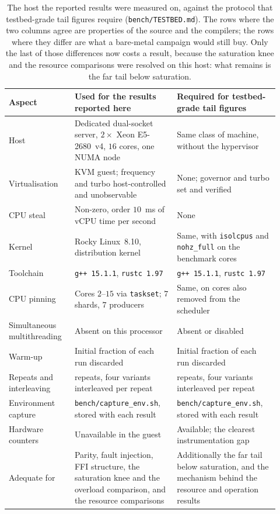 \documentclass[english,twoside,openright,a4paper,censored,csm,software-track-2020]{HYthesisML}
\begin{document}
\begin{table}
\centering
\small
\caption[The host used and the testbed protocol still to be executed]{The host the reported
results were measured on, against the protocol that testbed-grade tail figures require
(\texttt{bench/TESTBED.md}). The rows where the two columns agree are properties of the source and
the compilers; the rows where they differ are what a bare-metal campaign would still buy. Only the
last of those differences now costs a result, because the saturation knee and the resource
comparisons were resolved on this host: what remains is the far tail below
saturation.\label{tab:testbed}}
\renewcommand{\arraystretch}{1.2}
\begin{tabular}{@{}R{0.22\linewidth} R{0.35\linewidth} R{0.35\linewidth}@{}}
\hline\hline
Aspect & Used for the results reported here & Required for testbed-grade tail figures \\
\hline
Host & Dedicated dual-socket server, $2\times$ Xeon E5-2680~v4, $16$ cores, one NUMA node & Same class of machine, without the hypervisor \\
Virtualisation & KVM guest; frequency and turbo host-controlled and unobservable & None; governor and turbo set and verified \\
CPU steal & Non-zero, order $10$~ms of vCPU time per second & None \\
Kernel & Rocky Linux~8.10, distribution kernel & Same, with \texttt{isolcpus} and \texttt{nohz\_full} on the benchmark cores \\
Toolchain & \texttt{g++~15.1.1}, \texttt{rustc~1.97} & \texttt{g++~15.1.1}, \texttt{rustc~1.97} \\
CPU pinning & Cores $2$--$15$ via \texttt{taskset}; $7$ shards, $7$ producers & Same, on cores also removed from the scheduler \\
Simultaneous multithreading & Absent on this processor & Absent or disabled \\
Warm-up & Initial fraction of each run discarded & Initial fraction of each run discarded \\
Repeats and interleaving & \NRepeats{} repeats, four variants interleaved per repeat & \NRepeats{} repeats, four variants interleaved per repeat \\
Environment capture & \texttt{bench/capture\_env.sh}, stored with each result & \texttt{bench/capture\_env.sh}, stored with each result \\
Hardware counters & Unavailable in the guest & Available; the clearest instrumentation gap \\
\hline
Adequate for & Parity, fault injection, FFI structure, the saturation knee and the overload comparison, and the resource comparisons & Additionally the far tail below saturation, and the mechanism behind the resource and operation results \\
\hline
\end{tabular}
\end{table}
\end{document}
